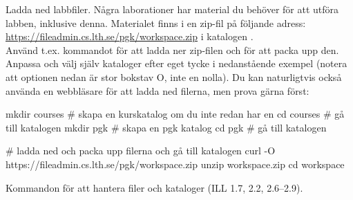\begin{Datorarbete}
\item Ladda ned labbfiler. Några laborationer har material du behöver för att utföra labben, inklusive denna. Materialet finns i en zip-fil på följande adress:\\
\url{https://fileadmin.cs.lth.se/pgk/workspace.zip} i katalogen .\\
Använd t.ex. kommandot  för att ladda ner zip-filen och  för att packa upp den. Anpassa och välj själv kataloger efter eget tycke i nedanstående exempel (notera att optionen  nedan är stor bokstav O, inte en nolla). Du kan naturligtvis också använda en webbläsare för att ladda ned filerna, men prova gärna  först:

\begin{Code}[language=bash,keywords=]
mkdir courses    # skapa en kurskatalog om du inte redan har en
cd courses       # gå till katalogen
mkdir pgk        # skapa en pgk katalog
cd pgk           # gå till katalogen

# ladda ned och packa upp filerna och gå till katalogen
curl -O https://fileadmin.cs.lth.se/pgk/workspace.zip
unzip workspace.zip
cd workspace
\end{Code}

\item Kommandon för att hantera filer och kataloger (ILL 1.7, 2.2, 2.6--2.9).


\end{Datorarbete}
